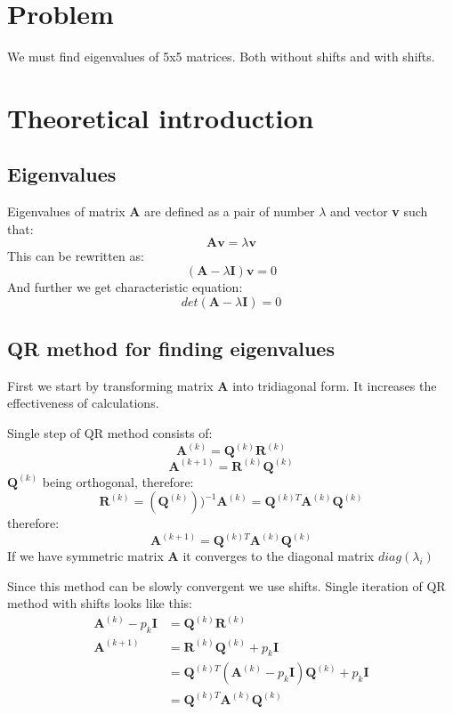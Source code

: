 \documentclass[12pt]{report}
\begin{document}
\section{Problem}
We must find eigenvalues of 5x5 matrices. Both without shifts and with shifts.
\section{Theoretical introduction}
\subsection{Eigenvalues}
Eigenvalues of matrix \textbf{A} are defined as a pair of number $\lambda$ and vector \textbf{v} such that:
\[ \mathbf{A}\mathbf{v} = \lambda\mathbf{v} \]
This can be rewritten as:
\[ (\mathbf{A} - \lambda\mathbf{I})\mathbf{v} = 0 \]
And further we get characteristic equation:
\[ det(\mathbf{A} - \lambda\mathbf{I}) = 0 \]

\subsection{QR method for finding eigenvalues}
First we start by transforming matrix \textbf{A} into tridiagonal form. It increases the effectiveness of calculations.

Single step of QR method consists of:
\[ \textbf{A}^{(k)} = \textbf{Q}^{(k)}\textbf{R}^{(k)} \]
\[ \textbf{A}^{(k+1)} = \textbf{R}^{(k)}\textbf{Q}^{(k)} \]
$\textbf{Q}^{(k)}$ being orthogonal, therefore:
\[ \textbf{R}^{(k)} = (\textbf{Q}^{(k)}))^{-1}\textbf{A}^{(k)} = \textbf{Q}^{(k)T}\textbf{A}^{(k)}\textbf{Q}^{(k)} \]
therefore:
\[ \textbf{A}^{(k+1)} = \textbf{Q}^{(k)T}\textbf{A}^{(k)}\textbf{Q}^{(k)} \]
If we have symmetric matrix \textbf{A} it converges to the diagonal matrix $diag(\lambda_i)$

Since this method can be slowly convergent we use shifts. Single iteration of QR method with shifts looks like this:
\begin{equation}
\begin{split}
\textbf{A}^{(k)} - p_k\textbf{I} &= \textbf{Q}^{(k)}\textbf{R}^{(k)} \\
\textbf{A}^{(k+1)} &= \textbf{R}^{(k)}\textbf{Q}^{(k)} + p_k\textbf{I} \\
&= \textbf{Q}^{(k)T}(\textbf{A}^{(k)} - p_k\textbf{I})\textbf{Q}^{(k)} + p_k\textbf{I} \\
&=\textbf{Q}^{(k)T}\textbf{A}^{(k)}\textbf{Q}^{(k)} \\
\end{split}
\end{equation}
\end{document}
